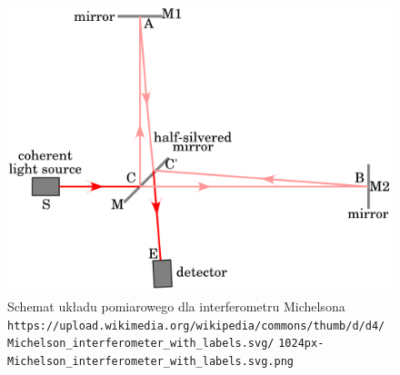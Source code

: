 \documentclass[a4paper]{article}
\newlength{\du}
\begin{document}
\begin{figure}[h]
\centering
\includegraphics[scale=0.2]{Michelson_interferometer.png}
\caption{Schemat układu pomiarowego dla interferometru Michelsona
\texttt{https://upload.wikimedia.org/wikipedia/commons/thumb/d/d4/} \newline
\texttt{Michelson\_interferometer\_with\_labels.svg/} \newline
\texttt{1024px-Michelson\_interferometer\_with\_labels.svg.png} \newline
}
\label{michelson}
\end{figure}
\end{document}
